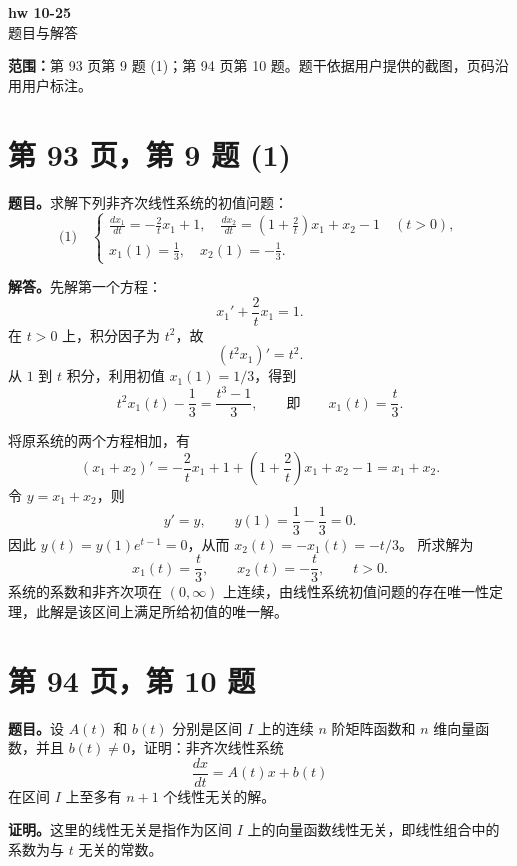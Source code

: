 \documentclass[11pt,a4paper]{ctexart}
\begin{document}
\begin{center}{\LARGE\bfseries hw 10-25}\\[7pt]题目与解答\end{center}
\textbf{范围：}第 93 页第 9 题 (1)；第 94 页第 10 题。题干依据用户提供的截图，页码沿用用户标注。

\section*{第 93 页，第 9 题 (1)}
\textbf{题目。}求解下列非齐次线性系统的初值问题：
\[
\text{(1)}\quad
\begin{cases}
\displaystyle\frac{dx_1}{dt}=-\frac2t x_1+1,\quad
\displaystyle\frac{dx_2}{dt}=\left(1+\frac2t\right)x_1+x_2-1
\quad(t>0),\\[7pt]
\displaystyle x_1(1)=\frac13,\quad x_2(1)=-\frac13.
\end{cases}
\]

\textbf{解答。}先解第一个方程：
\[
x_1'+\frac2t x_1=1.
\]
在 $t>0$ 上，积分因子为 $t^2$，故
\[
(t^2x_1)'=t^2.
\]
从 $1$ 到 $t$ 积分，利用初值 $x_1(1)=1/3$，得到
\[
t^2x_1(t)-\frac13=\frac{t^3-1}{3},
\qquad\text{即}\qquad x_1(t)=\frac t3.
\]

将原系统的两个方程相加，有
\[
(x_1+x_2)'=
-\frac2t x_1+1+\left(1+\frac2t\right)x_1+x_2-1
=x_1+x_2.
\]
令 $y=x_1+x_2$，则
\[
y'=y,\qquad y(1)=\frac13-\frac13=0.
\]
因此 $y(t)=y(1)e^{t-1}=0$，从而 $x_2(t)=-x_1(t)=-t/3$。
所求解为
\[
\boxed{\quad x_1(t)=\frac t3,\qquad x_2(t)=-\frac t3,\qquad t>0.\quad}
\]
系统的系数和非齐次项在 $(0,\infty)$ 上连续，由线性系统初值问题的存在唯一性定理，此解是该区间上满足所给初值的唯一解。

\newpage
\section*{第 94 页，第 10 题}
\textbf{题目。}设 $A(t)$ 和 $b(t)$ 分别是区间 $I$ 上的连续 $n$ 阶矩阵函数和 $n$ 维向量函数，并且 $b(t)\ne0$，证明：非齐次线性系统
\[
\frac{dx}{dt}=A(t)x+b(t)
\]
在区间 $I$ 上至多有 $n+1$ 个线性无关的解。

\textbf{证明。}这里的线性无关是指作为区间 $I$ 上的向量函数线性无关，即线性组合中的系数为与 $t$ 无关的常数。
\end{document}
